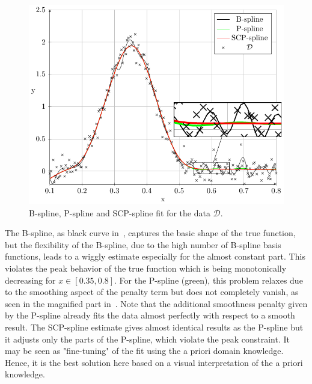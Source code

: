 \begin{figure}[H]
	\centering
	\includegraphics{graphics/pgfplots/cha4/exp-peak.pdf}
	\caption{B-spline, P-spline and SCP-spline fit for the data $\mathcal{D}$.}
	\label{fig:test-func-peak-fit}
\end{figure}
%
The B-spline, as black curve in~, captures the basic shape of the true function, but the flexibility of the B-spline, due to the high number of B-spline basis functions, leads to a wiggly estimate especially for the almost constant part. This violates the peak behavior of the true function which is being monotonically decreasing for $x \in [0.35, 0.8]$. For the P-spline (green), this problem relaxes due to the smoothing aspect of the penalty term but does not completely vanish, as seen in the magnified part in~. Note that the additional smoothness penalty given by the P-spline already fits the data almost perfectly with respect to a smooth result. The SCP-spline estimate gives almost identical results as the P-spline but it adjusts only the parts of the P-spline, which violate the peak constraint. It may be seen as "fine-tuning" of the fit using the a priori domain knowledge. Hence, it is the best solution here based on a visual interpretation of the a priori knowledge.

